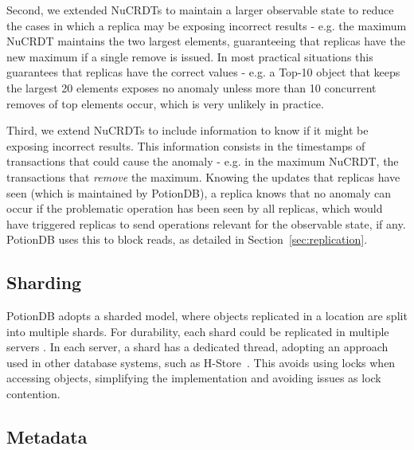 \documentclass[sigplan,twocolumn,review,anonymous]{acmart}
\begin{document}
Second, we extended NuCRDTs to maintain a larger observable state to 
reduce the cases in which a replica may be exposing incorrect results - e.g. 
the maximum NuCRDT maintains the two largest elements, guaranteeing that replicas have 
the new maximum if a single remove is issued.
In most practical situations this guarantees that replicas have the correct values - e.g. 
a Top-10 object that keeps the largest 20 elements exposes no anomaly unless
more than 10 concurrent removes of top elements occur, which is very unlikely in practice.

Third, we extend NuCRDTs to include information to know if it might be exposing incorrect results. 
This information consists in the timestamps of transactions that could cause the anomaly - e.g. in the maximum NuCRDT, 
the transactions that \emph{remove} the maximum.
Knowing the updates that replicas have seen (which is maintained by PotionDB), 
a replica knows that no anomaly can occur if the problematic operation has been seen by all replicas, 
which would have triggered replicas to send operations relevant for the observable state, if any.
PotionDB uses this to block reads, as detailed in Section~\ref{sec:replication}.




\subsection{Sharding}
\label{subsec:sharding}

PotionDB adopts a sharded model, where objects replicated in a location are 
split into multiple shards. For durability, each shard could be replicated in multiple
servers \cite{paxos,raft}. %
In each server, a shard has a dedicated thread, adopting an approach used in other
database systems, such as H-Store~\cite{h-store}. This avoids using locks when 
accessing objects, simplifying the implementation and avoiding issues 
as lock contention.

\subsection{Metadata}
\label{subsec:metadata}
\end{document}

